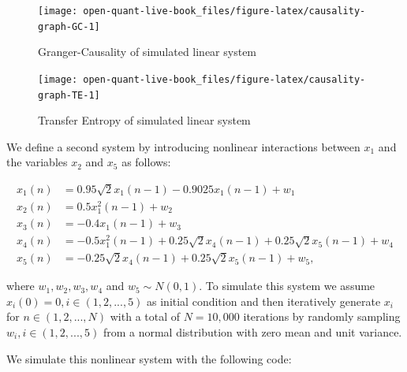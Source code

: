 \documentclass[]{book}
\theoremstyle{definition}
\theoremstyle{definition}
\theoremstyle{definition}
\theoremstyle{remark}
\begin{document}
\begin{figure}[H]

{\centering \texttt{[image: open-quant-live-book\_files/figure-latex/causality-graph-GC-1]} 

}

\caption{Granger-Causality of simulated linear system}\label{fig:causality-graph-GC}
\end{figure}

\begin{figure}[H]

{\centering \texttt{[image: open-quant-live-book\_files/figure-latex/causality-graph-TE-1]} 

}

\caption{Transfer Entropy of simulated linear system}\label{fig:causality-graph-TE}
\end{figure}

We define a second system by introducing nonlinear interactions between
\(x_1\) and the variables \(x_2\) and \(x_5\) as follows:

\begin{align}
x_1(n) &= 0.95\sqrt{2}x_1(n-1) - 0.9025x_1(n-1) + w_1\\ \nonumber
x_2(n) &= 0.5x_1^2(n-1) + w_2\\ \nonumber
x_3(n) &= -0.4x_1(n-1) + w_3\\ \nonumber
x_4(n) &= -0.5x_1^2(n-1) + 0.25\sqrt{2}x_4(n-1) + 0.25\sqrt{2}x_5(n-1) + w_4\\ \nonumber
x_5(n) &= -0.25\sqrt{2}x_4(n-1) + 0.25\sqrt{2}x_5(n-1) + w_5, \nonumber
\end{align}

where \(w_1, w_2, w_3, w_4\) and \(w_5 \sim N(0, 1)\). To simulate this
system we assume \(x_i(0) = 0, i \in (1, 2, ..., 5)\) as initial
condition and then iteratively generate \(x_i\) for
\(n \in (1, 2, ..., N)\) with a total of \(N = 10,000\) iterations by
randomly sampling \(w_i, i \in (1, 2, ..., 5)\) from a normal
distribution with zero mean and unit variance.

We simulate this nonlinear system with the following code:
\end{document}
